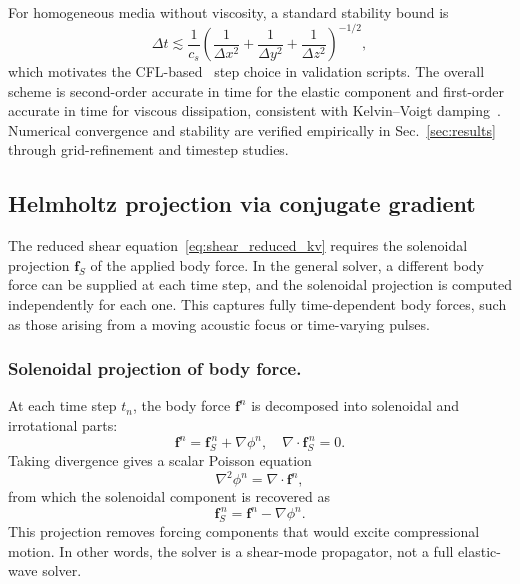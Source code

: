\documentclass{iopjournal}
\begin{document}
For homogeneous media without viscosity, a standard stability bound is
\begin{equation}
\Delta t \lesssim \frac{1}{c_s}
\left(
\frac{1}{\Delta x^2}+\frac{1}{\Delta y^2}+\frac{1}{\Delta z^2}
\right)^{-1/2},
\end{equation}
which motivates the CFL-based~\cite{courant1928partial} step choice in
validation scripts. The overall scheme is second-order accurate in time for the
elastic component and first-order accurate in time for viscous dissipation,
consistent with Kelvin--Voigt
damping~\cite{catheline2004viscoelastic}. Numerical convergence and stability
are verified empirically in Sec.~\ref{sec:results} through grid-refinement
and timestep studies.

\subsection{Helmholtz projection via conjugate gradient}
\label{sec:helmholtz_projection}

The reduced shear equation~\eqref{eq:shear_reduced_kv} requires the solenoidal
projection $\bm{f}_S$ of the applied body force. In the general solver, a
different body force can be supplied at each time step, and the solenoidal
projection is computed independently for each one. This captures fully
time-dependent body forces, such as those arising from a moving acoustic focus
or time-varying pulses.

\subsubsection{Solenoidal projection of body force.}
At each time step $t_n$, the body force $\bm{f}^n$ is decomposed into
solenoidal and irrotational parts:
\begin{equation}
\bm{f}^n = \bm{f}_S^{\,n} + \nabla \phi^n,
\quad
\nabla\cdot\bm{f}_S^{\,n}=0.
\end{equation}
Taking divergence gives a scalar Poisson equation
\begin{equation}
\nabla^2 \phi^n = \nabla\cdot\bm{f}^n,
\end{equation}
from which the solenoidal component is recovered as
\begin{equation}
\bm{f}_S^{\,n} = \bm{f}^n - \nabla\phi^n.
\end{equation}
This projection removes forcing components that would excite compressional
motion. In other words, the solver is a shear-mode propagator, not a full elastic-wave solver.
\end{document}
